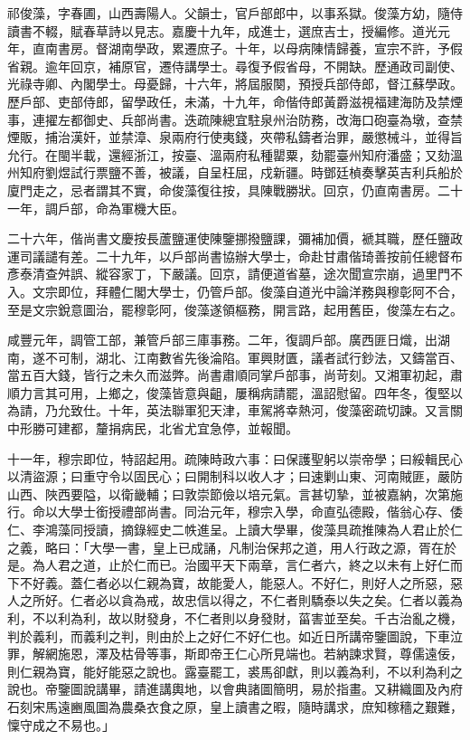 \begin{pinyinscope}
祁俊藻，字春圃，山西壽陽人。父韻士，官戶部郎中，以事系獄。俊藻方幼，隨侍讀書不輟，賦春草詩以見志。嘉慶十九年，成進士，選庶吉士，授編修。道光元年，直南書房。督湖南學政，累遷庶子。十年，以母病陳情歸養，宣宗不許，予假省親。逾年回京，補原官，遷侍講學士。尋復予假省母，不開缺。歷通政司副使、光祿寺卿、內閣學士。母憂歸，十六年，將屆服闋，預授兵部侍郎，督江蘇學政。歷戶部、吏部侍郎，留學政任，未滿，十九年，命偕侍郎黃爵滋視福建海防及禁煙事，連擢左都御史、兵部尚書。迭疏陳總宜駐泉州治防務，改海口砲臺為墩，查禁煙販，捕治漢奸，並禁漳、泉兩府行使夷錢，夾帶私鑄者治罪，嚴懲械斗，並得旨允行。在閩半載，還經浙江，按臺、溫兩府私種罌粟，劾罷臺州知府潘盛；又劾溫州知府劉煜試行票鹽不善，被議，自呈枉屈，戍新疆。時鄧廷楨奏擊英吉利兵船於廈門走之，忌者謂其不實，命俊藻復往按，具陳戰勝狀。回京，仍直南書房。二十一年，調戶部，命為軍機大臣。

二十六年，偕尚書文慶按長蘆鹽運使陳鑒挪撥鹽課，彌補加價，褫其職，歷任鹽政運司議譴有差。二十九年，以戶部尚書協辦大學士，命赴甘肅偕琦善按前任總督布彥泰清查舛誤、縱容家丁，下嚴議。回京，請便道省墓，途次聞宣宗崩，過里門不入。文宗即位，拜體仁閣大學士，仍管戶部。俊藻自道光中論洋務與穆彰阿不合，至是文宗銳意圖治，罷穆彰阿，俊藻遂領樞務，開言路，起用舊臣，俊藻左右之。

咸豐元年，調管工部，兼管戶部三庫事務。二年，復調戶部。廣西匪日熾，出湖南，遂不可制，湖北、江南數省先後淪陷。軍興財匱，議者試行鈔法，又鑄當百、當五百大錢，皆行之未久而滋弊。尚書肅順同掌戶部事，尚苛刻。又湘軍初起，肅順力言其可用，上鄉之，俊藻皆意與齟，屢稱病請罷，溫詔慰留。四年冬，復堅以為請，乃允致仕。十年，英法聯軍犯天津，車駕將幸熱河，俊藻密疏切諫。又言關中形勝可建都，釐捐病民，北省尤宜急停，並報聞。

十一年，穆宗即位，特詔起用。疏陳時政六事：曰保護聖躬以崇帝學；曰綏輯民心以清盜源；曰重守令以固民心；曰開制科以收人才；曰速剿山東、河南賊匪，嚴防山西、陜西要隘，以衛畿輔；曰敦崇節儉以培元氣。言甚切摯，並被嘉納，次第施行。命以大學士銜授禮部尚書。同治元年，穆宗入學，命直弘德殿，偕翁心存、倭仁、李鴻藻同授讀，摘錄經史二帙進呈。上讀大學畢，俊藻具疏推陳為人君止於仁之義，略曰：「大學一書，皇上已成誦，凡制治保邦之道，用人行政之源，胥在於是。為人君之道，止於仁而已。治國平天下兩章，言仁者六，終之以未有上好仁而下不好義。蓋仁者必以仁親為寶，故能愛人，能惡人。不好仁，則好人之所惡，惡人之所好。仁者必以貪為戒，故忠信以得之，不仁者則驕泰以失之矣。仁者以義為利，不以利為利，故以財發身，不仁者則以身發財，菑害並至矣。千古治亂之機，判於義利，而義利之判，則由於上之好仁不好仁也。如近日所講帝鑒圖說，下車泣罪，解網施恩，澤及枯骨等事，斯即帝王仁心所見端也。若納諫求賢，尊儒遠佞，則仁親為寶，能好能惡之說也。露臺罷工，裘馬卻獻，則以義為利，不以利為利之說也。帝鑒圖說講畢，請進講輿地，以會典諸圖簡明，易於指畫。又耕織圖及內府石刻宋馬遠豳風圖為農桑衣食之原，皇上讀書之暇，隨時講求，庶知稼穡之艱難，懍守成之不易也。」


\end{pinyinscope}
